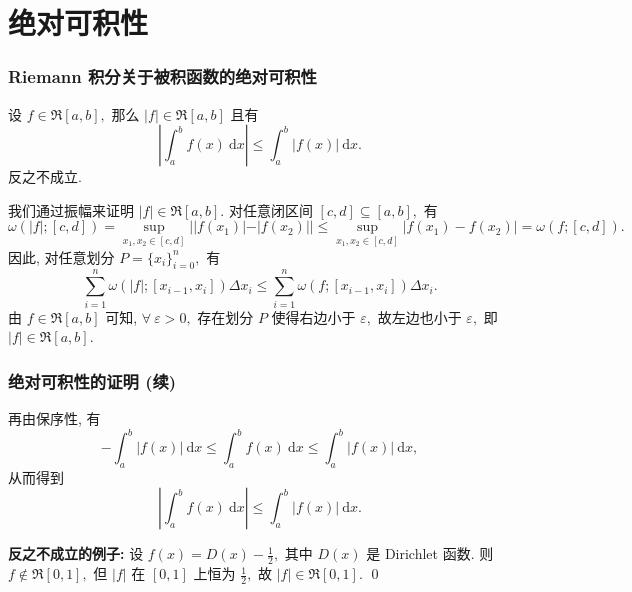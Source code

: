 
\section{绝对可积性}


\begin{frame}
\frametitle{Riemann 积分关于被积函数的绝对可积性}

\begin{prop}[绝对可积性]
设 $f \in \mathfrak{R}[a, b],$ 那么 $|f| \in \mathfrak{R}[a, b]$ 且有
\[
\left| \int_a^b f(x) ~ \mathrm{d} x \right| \leqslant \int_a^b |f(x)| ~ \mathrm{d} x.
\]
\alert{反之不成立.}
\end{prop}

\pause
\vspace{1em}

\startproof[bg=yellow, fg=red]
我们通过振幅来证明 $|f| \in \mathfrak{R}[a, b].$ 对任意闭区间 $[c, d] \subseteq [a, b],$ 有
\[
\omega(|f|; [c, d]) = \sup_{x_1, x_2 \in [c, d]} ||f(x_1)| - |f(x_2)|| \leqslant \sup_{x_1, x_2 \in [c, d]} |f(x_1) - f(x_2)| = \omega(f; [c, d]).
\]
因此, 对任意划分 $P = \{x_i\}_{i=0}^n,$ 有
\[
\sum_{i=1}^n \omega(|f|; [x_{i-1}, x_i]) \Delta x_i \leqslant \sum_{i=1}^n \omega(f; [x_{i-1}, x_i]) \Delta x_i.
\]
由 $f \in \mathfrak{R}[a, b]$ 可知, $\forall ~ \varepsilon > 0,$ 存在划分 $P$ 使得右边小于 $\varepsilon,$ 故左边也小于 $\varepsilon,$ 即 $|f| \in \mathfrak{R}[a, b].$

\end{frame}


\begin{frame}
\frametitle{绝对可积性的证明 (续)}

再由保序性, 有
\[-\int_a^b |f(x)| ~ \mathrm{d} x \leqslant \int_a^b f(x) ~ \mathrm{d} x \leqslant \int_a^b |f(x)| ~ \mathrm{d} x,\]
从而得到
\[\left| \int_a^b f(x) ~ \mathrm{d} x \right| \leqslant \int_a^b |f(x)| ~ \mathrm{d} x.\]

\pause
\vspace{1em}

\textbf{反之不成立的例子:} 设 $f(x) = D(x) - \frac{1}{2},$ 其中 $D(x)$ 是 Dirichlet 函数. 则 $f \notin \mathfrak{R}[0, 1],$ 但 $|f|$ 在 $[0, 1]$ 上恒为 $\frac{1}{2},$ 故 $|f| \in \mathfrak{R}[0, 1].$
\qed

\end{frame}

